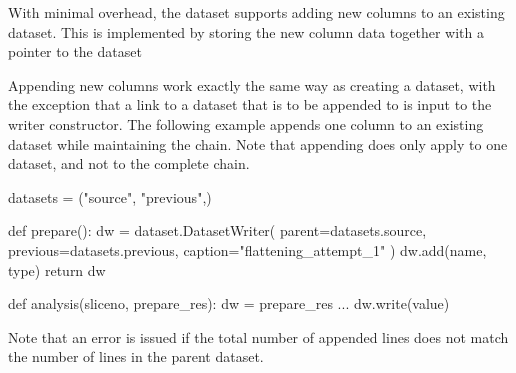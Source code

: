 With minimal overhead, the dataset supports adding new columns to an
existing dataset.  This is implemented by storing the new column data
together with a pointer to the dataset

Appending new columns work exactly the same way as creating a dataset,
with the exception that a link to a dataset that is to be appended to
is input to the writer constructor.  The following example appends one
column to an existing dataset while maintaining the chain.  Note that
appending does only apply to one dataset, and not to the complete
chain.

\begin{python}
datasets = ("source", "previous",)

def prepare():
  dw = dataset.DatasetWriter(
    parent=datasets.source,
    previous=datasets.previous,
    caption="flattening_attempt_1"
  )
  dw.add(name, type)
  return dw

def analysis(sliceno, prepare_res):
  dw = prepare_res
  ...
  dw.write(value)
\end{python}

Note that an error is issued if the total number of appended lines
does not match the number of lines in the parent dataset.

